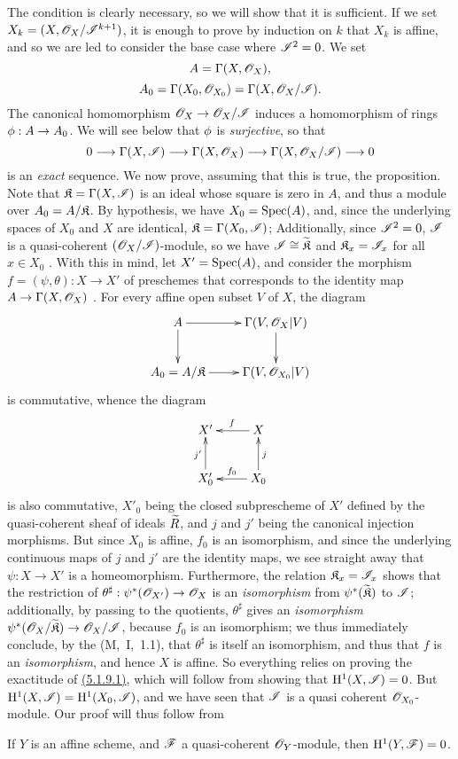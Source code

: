 The condition is clearly necessary, so we will show that it is sufficient.
If we set $X_k=(X,\mathscr{O}_X/\mathscr{I}^{k+1})$, it is enough to prove by induction on $k$ that $X_k$ is affine, and so we are led to consider the base case where $\mathscr{I}^2=0$.
We set
\[
  A=\Gamma(X,\mathscr{O}_X),
\]
\[
  A_0=\Gamma(X_0,\mathscr{O}_{X_0})=\Gamma(X,\mathscr{O}_X/\mathscr{I}).
\]
The canonical homomorphism $\OO_X\to\OO_X/\sh{I}$ induces a homomorphism of rings $\vphi:A\to A_0$.
We will see below that $\phi$ is \emph{surjective}, so that
\[
  0\to\Gamma(X,\sh{I})\to\Gamma(X,\OO_X)\to\Gamma(X,\OO_X/\sh{I})\to 0
\]
is an \emph{exact} sequence.
We now prove, assuming that this is true, the proposition.
Note that $\mathfrak{K}=\Gamma(X,\mathscr{I})$ is an ideal whose square is zero in $A$, and thus a module over $A_0=A/\mathfrak{K}$.
By hypothesis, we have $X_0={\mathop{\mathrm{Spec}}\nolimits}(A)$, and, since the underlying spaces of $X_0$ and $X$ are identical, $\mathfrak{K}=\Gamma(X_0,\mathscr{I})$;
Additionally, since $\mathscr{I}^2=0$, $\mathscr{I}$ is a quasi-coherent $(\mathscr{O}_X/\mathscr{I})$-module, so we have $\mathscr{I}\cong{\widetilde{\mathfrak{K}}}$ and $\mathfrak{K}_x=\mathscr{I}_x$ for all $x\in X_0$ .
With this in mind, let $X'={\mathop{\mathrm{Spec}}\nolimits}(A)$, and consider the morphism $f=(\psi,\theta):X\to X'$ of preschemes that corresponds to the identity map $A\to\Gamma(X,\OO_X)$ .
For every affine open subset $V$ of $X$, the diagram
\[
  \xymatrix{
    A\ar[r]\ar[d] &
    \Gamma(V,\OO_X|V)\ar[d]\\
    A_0=A/\fk{K}\ar[r] &
    \Gamma(V,\OO_{X_0}|V)
  }
\]
is commutative, whence the diagram
\[
  \xymatrix{
    X' &
    X\ar[l]_f\\
    X'_0\ar[u]^{j'} &
    X_0\ar[l]_{f_0}\ar[u]_j
  }
\]
is also commutative, $X'_0$ being the closed subprescheme of $X'$ defined by the quasi-coherent sheaf of ideals ${\widetilde{R}}$, and $j$ and $j'$ being the canonical injection morphisms.
But since $X_0$ is affine, $f_0$ is an isomorphism, and since the underlying continuous maps of $j$ and $j'$ are the identity maps, we see straight away that $\psi:X\to X'$ is a homeomorphism.
Furthermore, the relation $\mathfrak{K}_x=\mathscr{I}_x$ shows that the restriction of $\theta^\sharp:\psi^*(\OO_{X'})\to\OO_X$ is an \emph{isomorphism} from $\psi^*({\widetilde{\mathfrak{K}}})$ to $\mathscr{I}$;
additionally, by passing to the quotients, $\theta^\sharp$ gives an \emph{isomorphism} $\psi^*(\OO_X/\wt{\fk{K}})\to\OO_X/\sh{I}$, because $f_0$ is an isomorphism;
we thus immediately conclude, by the  (M,~I,~1.1), that $\theta^\sharp$ is itself an isomorphism, and thus that $f$ is an \emph{isomorphism}, and hence $X$ is affine.
So everything relies on proving the exactitude of \hyperref[1.5.1.9]{(5.1.9.1)}, which will follow from showing that $\mathrm{H}^1(X,\mathscr{I})=0$.
But $\mathrm{H}^1(X,\mathscr{I})=\mathrm{H}^1(X_0,\mathscr{I})$, and we have seen that $\mathscr{I}$ is a quasi coherent $\mathscr{O}_{X_0}$-module.
Our proof will thus follow from
\begin{lem}[5.1.9.2]
\label{1.5.1.9.2}
If $Y$ is an affine scheme, and $\mathscr{F}$ a quasi-coherent $\mathscr{O}_Y$-module, then $\mathrm{H}^1(Y,\mathscr{F})=0$.
\end{lem}

